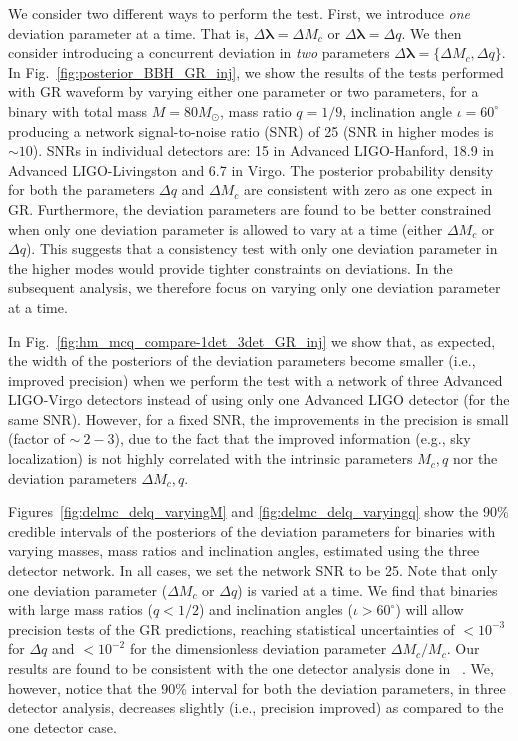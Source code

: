 \documentclass[prd,preprintnumbers,twocolumn,eqsecnum,floatfix,a4paper,nofootinbib,superscriptaddress]{revtex4}
\newcommand{\blambda}{\bm{\lambda}}
\begin{document}
We consider two different ways to perform the test. First, we introduce \emph{one} deviation parameter at a time. That is, $\Delta\blambda = {\Delta M_c}$ or $\Delta\blambda = {\Delta q}$. We then consider introducing a concurrent deviation in \emph{two} parameters $\Delta \blambda = \{\Delta M_c, \Delta q\}$. In Fig.~\ref{fig:posterior_BBH_GR_inj}, we show the results of the tests performed with GR waveform by varying either one parameter or two parameters, for a binary with total mass $M = 80M_{\odot}$, mass ratio $q=1/9$, inclination angle $ {\iota}=60^{\circ} $ producing a network signal-to-noise ratio  (SNR)  of 25 (SNR in higher modes is $\sim 10$). SNRs in individual detectors are: 15 in Advanced LIGO-Hanford, 18.9 in Advanced LIGO-Livingston and 6.7 in Virgo. The posterior probability density for both the parameters $\Delta q$ and $\Delta M_c$ are consistent with zero as one expect in GR. Furthermore, the deviation parameters are found to be better constrained when only one deviation parameter is allowed to vary at a time (either $\Delta M_c$ or $\Delta q$). This suggests that a consistency test with only one deviation parameter in the higher modes would provide tighter constraints on deviations. In the subsequent analysis, we therefore focus on varying only one deviation parameter at a time. 

In Fig.~\ref{fig:hm_mcq_compare-1det_3det_GR_inj} we show that, as expected, the width of the posteriors of the deviation parameters become smaller (i.e., improved precision) when we perform the test with a network of three Advanced LIGO-Virgo detectors instead of using only one Advanced LIGO detector (for the same SNR). However, for a fixed SNR, the improvements in the precision is small (factor of $\sim ~2-3$), due to the fact that the improved information (e.g., sky localization) is not highly correlated with the intrinsic parameters $M_c, q$ nor the deviation parameters $\Delta M_c, q$. 

Figures~\ref{fig:delmc_delq_varyingM} and \ref{fig:delmc_delq_varyingq} show the 90\% credible intervals of the posteriors of the deviation parameters for binaries with varying masses, mass ratios and inclination angles, estimated using the three detector network. In all cases, we set the network SNR to be {25}. Note that only one deviation parameter ($\Delta M_c$ or $\Delta q$) is varied at a time.  We find that binaries with large mass ratios ($q < 1/ 2$) and inclination angles ($\iota > 60 ^\circ $) will allow precision tests of the GR predictions, reaching statistical uncertainties of $< 10^{-3}$ for $\Delta q$ and $< 10^{-2}$ for the dimensionless deviation parameter $\Delta M_c/M_c$. Our results are found to be consistent with the one detector analysis done in ~\cite{Dhanpal:2018ufk}. We, however, notice that the 90\% interval for both the deviation parameters, in three detector analysis, decreases slightly (i.e., precision improved) as compared to the one detector case.
 
\end{document}
